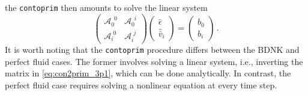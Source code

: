 \documentclass[prd,aps,twocolumn,floats,floatfix,nofootinbib,superscriptaddress] {revtex4-1}
\begin{document}
the \verb|contoprim| then amounts to solve the linear system 
\begin{equation}
 \left(
\begin{array}{cc}
\mathcal{A}_{0}^{\phantom{0}0} & \mathcal{A}_{0}^{\phantom{0}i} \\
\mathcal{A}_{i}^{\phantom{i}0} & \mathcal{A}_{i}^{\phantom{i}j}
\end{array}
\right)
\left(
\begin{array}{c}
\hat\epsilon \\
\hat{\bar v}_i
\end{array}
\right) =
\left(
\begin{array}{c}
b_0 \\
b_i
\end{array}
\right)\,.
\label{eq:con2prim_3p1}
\end{equation}
It is worth noting that the \verb|contoprim| procedure differs between the BDNK and perfect fluid cases. The former involves solving a linear system, i.e., inverting the matrix in \eqref{eq:con2prim_3p1}, which can be done analytically. In contrast, the perfect fluid case requires solving a nonlinear equation at every time step.
\end{document}
